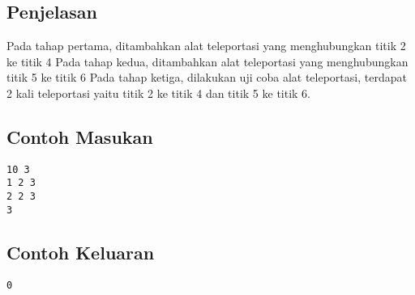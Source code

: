 \documentclass{article}
\begin{document}
\subsection*{Penjelasan}
Pada tahap pertama, ditambahkan alat teleportasi yang menghubungkan titik 2 ke titik 4
Pada tahap kedua, ditambahkan alat teleportasi yang menghubungkan titik 5 ke titik 6
Pada tahap ketiga, dilakukan uji coba alat teleportasi, terdapat 2 kali teleportasi yaitu titik 2 ke titik 4 dan titik 5 ke titik 6.
\pagebreak

\begin{multicols}{2}
\subsection*{Contoh Masukan}
\begin{lstlisting}
10 3
1 2 3
2 2 3
3
\end{lstlisting}
\columnbreak
\subsection*{Contoh Keluaran}
\begin{lstlisting}
0
\end{lstlisting}
\vfill
\null
\end{multicols}
\end{document}
